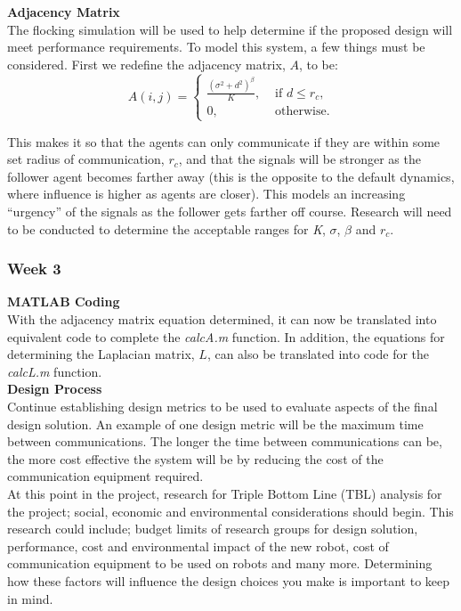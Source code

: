 \documentclass[../CourseManual.tex]{subfiles}
\begin{document}
\textbf{Adjacency Matrix}\\
The flocking simulation will be used to help determine if the proposed design will meet performance requirements. To model this system, a few things must be considered. First we redefine the adjacency matrix, $A$, to be:
\[
A(i,j) =
\begin{cases}
\frac{(\sigma^2 + d^2)^\beta}{K}, & \text{ if } d \leq r_c,\\
0, & \text{ otherwise.}
\end{cases}
\]

This makes it so that the agents can only communicate if they are within some set radius of communication, $r_c$, and that the signals will be stronger as the follower agent becomes farther away (this is the opposite to the default dynamics, where influence is higher as agents are closer). This models an increasing “urgency” of the signals as the follower gets farther off course. Research will need to be conducted to determine the acceptable ranges for \textit{K}, $\sigma$, $\beta$ and $r_c$. 

\subsubsection{Week 3} \label{Week 3: Flocking}
\textbf{MATLAB Coding}\\
With the adjacency matrix equation determined, it can now be translated into equivalent code to complete the \textit{calcA.m} function. In addition, the equations for determining the Laplacian matrix, $L$, can also be translated into code for the \textit{calcL.m} function. \\

\textbf{Design Process}\\
Continue establishing design metrics to be used to evaluate aspects of the final design solution. An example of one design metric will be the maximum time between communications. The longer the time between communications can be, the more cost effective the system will be by reducing the cost of the communication equipment required.\\

At this point in the project, research for Triple Bottom Line (TBL) analysis for the project; social, economic and environmental considerations should begin. This research could include; budget limits of research groups for design solution, performance, cost and environmental impact of the new robot, cost of communication equipment to be used on robots and many more. Determining how these factors will influence the design choices you make is important to keep in mind.\\
\end{document}
